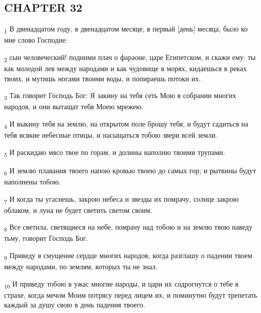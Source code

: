 \subsection{CHAPTER 32}
\begin{tcolorbox}
\textsubscript{1} В двенадцатом году, в двенадцатом месяце, в первый [день] месяца, было ко мне слово Господне:
\end{tcolorbox}
\begin{tcolorbox}
\textsubscript{2} сын человеческий! подними плач о фараоне, царе Египетском, и скажи ему: ты как молодой лев между народами и как чудовище в морях, кидаешься в реках твоих, и мутишь ногами твоими воды, и попираешь потоки их.
\end{tcolorbox}
\begin{tcolorbox}
\textsubscript{3} Так говорит Господь Бог: Я закину на тебя сеть Мою в собрании многих народов, и они вытащат тебя Моею мрежею.
\end{tcolorbox}
\begin{tcolorbox}
\textsubscript{4} И выкину тебя на землю, на открытом поле брошу тебя, и будут садиться на тебя всякие небесные птицы, и насыщаться тобою звери всей земли.
\end{tcolorbox}
\begin{tcolorbox}
\textsubscript{5} И раскидаю мясо твое по горам, и долины наполню твоими трупами.
\end{tcolorbox}
\begin{tcolorbox}
\textsubscript{6} И землю плавания твоего напою кровью твоею до самых гор; и рытвины будут наполнены тобою.
\end{tcolorbox}
\begin{tcolorbox}
\textsubscript{7} И когда ты угаснешь, закрою небеса и звезды их помрачу, солнце закрою облаком, и луна не будет светить светом своим.
\end{tcolorbox}
\begin{tcolorbox}
\textsubscript{8} Все светила, светящиеся на небе, помрачу над тобою и на землю твою наведу тьму, говорит Господь Бог.
\end{tcolorbox}
\begin{tcolorbox}
\textsubscript{9} Приведу в смущение сердце многих народов, когда разглашу о падении твоем между народами, по землям, которых ты не знал.
\end{tcolorbox}
\begin{tcolorbox}
\textsubscript{10} И приведу тобою в ужас многие народы, и цари их содрогнутся о тебе в страхе, когда мечом Моим потрясу перед лицем их, и поминутно будут трепетать каждый за душу свою в день падения твоего.
\end{tcolorbox}
